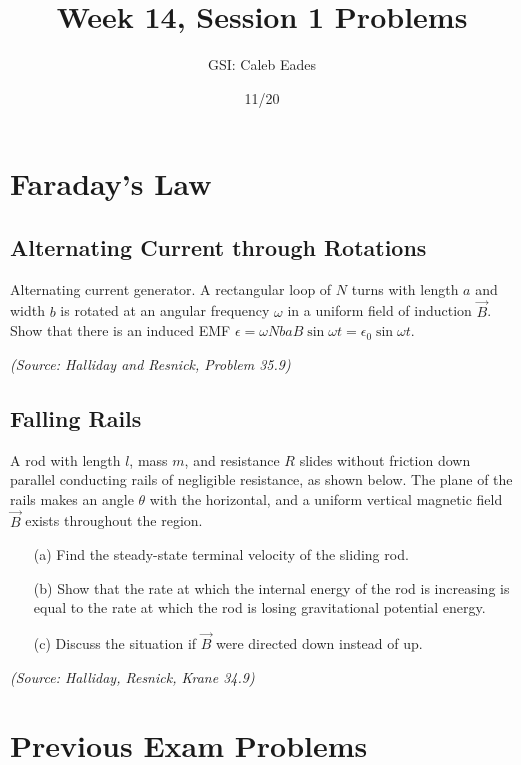 \documentclass{article}
\begin{document}
\title{Week 14, Session 1 Problems}
\author{GSI: Caleb Eades}
\date{11/20}
\maketitle

\section{Faraday's Law}

\subsection{Alternating Current through Rotations}

Alternating current generator. A rectangular loop of $N$ turns with length $a$ and width $b$ is rotated at an angular frequency $\omega$ in a uniform field of induction $\vec{B}$. Show that there is an induced EMF $\epsilon = \omega Nba B \sin \omega t = \epsilon_0 \sin \omega t$.

\textit{(Source: Halliday and Resnick, Problem 35.9)}

\subsection{Falling Rails}

A rod with length $l$, mass $m$, and resistance $R$ slides without friction down parallel conducting rails of negligible resistance, as shown below. The plane of the rails makes an angle $\theta$ with the horizontal, and a uniform vertical magnetic field $\vec{B}$ exists throughout the region.
\begin{itemize}
	\item[(a)] Find the steady-state terminal velocity of the sliding rod.
	\item[(b)] Show that the rate at which the internal energy of the rod is increasing is equal to the rate at which the rod is losing gravitational potential energy.
	\item[(c)] Discuss the situation if $\vec{B}$ were directed down instead of up.
\end{itemize}

\textit{(Source: Halliday, Resnick, Krane 34.9)}

\section{Previous Exam Problems}
\end{document}
